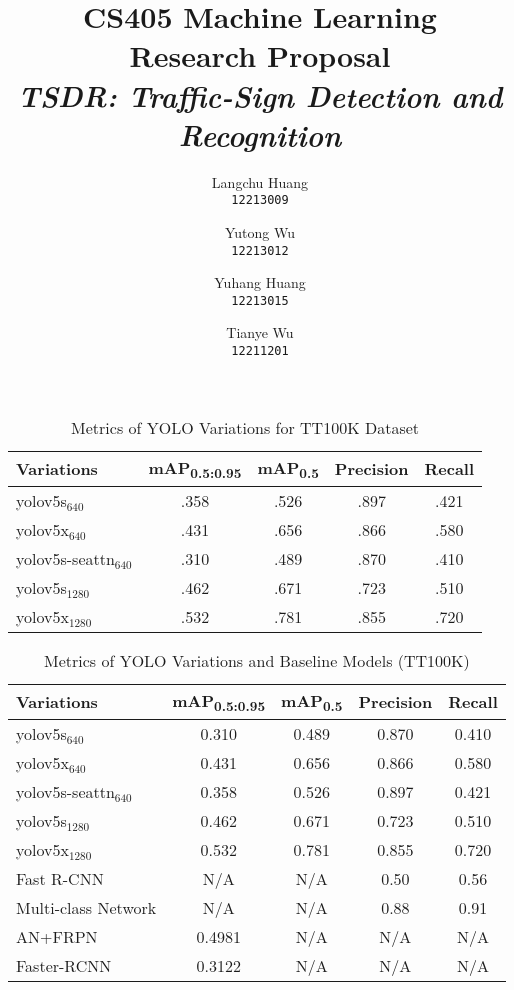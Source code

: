 \documentclass[letterpaper, 10 pt, conference]{ieeeconf}
\title{
\Large \bf CS405 Machine Learning\\
\huge Research Proposal\\
\vspace{0.5em}
\Large \textit{TSDR: Traffic-Sign Detection and Recognition}
}
\author{
Langchu Huang \\ 
\texttt{12213009} \\
\and
Yutong Wu \\ 
\texttt{12213012} \\
\and
Yuhang Huang \\ 
\texttt{12213015}
\and
Tianye Wu \\ 
\texttt{12211201} \\
}
\begin{document}
\begin{table}[h!]
\centering
\caption{Metrics of YOLO Variations for TT100K Dataset}
\label{tab:metrics}
\begin{tabular}{lcccc}
\toprule
Variations & mAP\textsubscript{0.5:0.95} & mAP\textsubscript{0.5} & Precision & Recall \\
\midrule
  yolov5s$_{640}$ & .358 & .526 & .897 & .421 \\
  yolov5x$_{640}$ & .431 & .656 & .866 & .580 \\
  yolov5s-seattn$_{640}$ & .310 & .489 & .870 & .410 \\
  yolov5s$_{1280}$ & .462 & .671 & .723 & .510 \\
  yolov5x$_{1280}$ & .532 & .781 & .855 & .720 \\
\bottomrule
\end{tabular}
\end{table}

\begin{table}[h!]
\centering
  \caption{Metrics of YOLO Variations and Baseline Models (TT100K)}
\label{tab:metrics_combined}
\begin{tabular}{lcccc}
\toprule
Variations & mAP\textsubscript{0.5:0.95} & mAP\textsubscript{0.5} & Precision & Recall \\
\midrule
  yolov5s$_{640}$ & 0.310 & 0.489 & 0.870 & 0.410 \\
  yolov5x$_{640}$ & 0.431 & 0.656 & 0.866 & 0.580 \\
  yolov5s-seattn$_{640}$ & 0.358 & 0.526 & 0.897 & 0.421 \\
  yolov5s$_{1280}$ & 0.462 & 0.671 & 0.723 & 0.510 \\
  yolov5x$_{1280}$ & 0.532 & 0.781 & 0.855 & 0.720 \\
\midrule
  Fast R-CNN & N/A & N/A & 0.50 & 0.56 \\
  Multi-class Network & N/A & N/A & 0.88 & 0.91 \\
  AN+FRPN & 0.4981 & N/A & N/A & N/A \\
  Faster-RCNN & 0.3122 & N/A & N/A & N/A \\
\bottomrule
\end{tabular}
\end{table}
\end{document}

